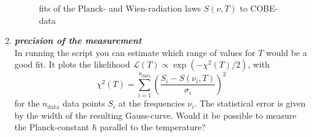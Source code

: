 \documentclass[a4paper,12pt]{article}
\newcommand{\question}[1]{\textbf{\textit{#1}}}
\begin{document}
\begin{enumerate}
\begin{figure}[h]
\begin{center}
\caption{fits of the Planck- and Wien-radiation laws $S(\nu,T)$ to COBE-data}
\end{center}
\end{figure}

\item \question{precision of the measurement}\\
In running the script  you can estimate which range of values for $T$ would be a good fit. It plots the likelihood $\mathcal{L}(T)\propto \exp(-\chi^2(T)/2)$, with 
\begin{equation}
\chi^2(T) = \sum_{i=1}^{n_\mathrm{data}}\left(\frac{S_i-S(\nu_i,T)}{\sigma_i}\right)^2
\end{equation}
for the $n_\mathrm{data}$ data points $S_i$ at the frequencies $\nu_i$. The statistical error is given by the width of the resulting Gauss-curve. Would it be possible to measure the Planck-constant $\hbar$ parallel to the temperature?


\end{enumerate}
\end{document}
